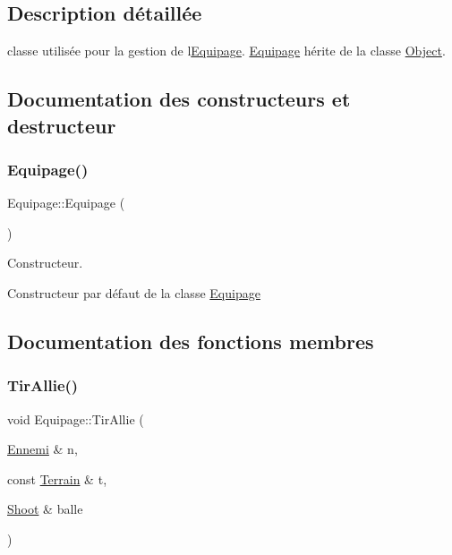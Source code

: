 \subsection{Description détaillée}
classe utilisée pour la gestion de l\textquotesingle{}\hyperlink{class_equipage}{Equipage}. \hyperlink{class_equipage}{Equipage} hérite de la classe \hyperlink{class_object}{Object}. 

\subsection{Documentation des constructeurs et destructeur}
\mbox{\label{class_equipage_a25d4958c4ad1d69eebe6b4e434794e07}} 
\subsubsection{\texorpdfstring{Equipage()}{Equipage()}}
{\footnotesize\ttfamily Equipage\+::\+Equipage (\begin{DoxyParamCaption}{ }\end{DoxyParamCaption})}



Constructeur. 

Constructeur par défaut de la classe \hyperlink{class_equipage}{Equipage} 

\subsection{Documentation des fonctions membres}
\mbox{\label{class_equipage_a2836ad0ea4c1f329ee3f9b88517f9d66}} 
\subsubsection{\texorpdfstring{Tir\+Allie()}{TirAllie()}}
{\footnotesize\ttfamily void Equipage\+::\+Tir\+Allie (\begin{DoxyParamCaption}\item[{\hyperlink{class_ennemi}{Ennemi} \&}]{n,  }\item[{const \hyperlink{class_terrain}{Terrain} \&}]{t,  }\item[{\hyperlink{class_shoot}{Shoot} \&}]{balle }\end{DoxyParamCaption})}



